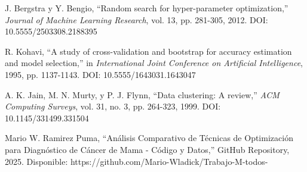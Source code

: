 \documentclass[conference]{IEEEtran}
\begin{document}
\begin{thebibliography}{00}
 J. Bergstra y Y. Bengio, ``Random search for hyper-parameter optimization,'' \textit{Journal of Machine Learning Research}, vol. 13, pp. 281-305, 2012. DOI: 10.5555/2503308.2188395

 R. Kohavi, ``A study of cross-validation and bootstrap for accuracy estimation and model selection,'' in \textit{International Joint Conference on Artificial Intelligence}, 1995, pp. 1137-1143. DOI: 10.5555/1643031.1643047

 A. K. Jain, M. N. Murty, y P. J. Flynn, ``Data clustering: A review,'' \textit{ACM Computing Surveys}, vol. 31, no. 3, pp. 264-323, 1999. DOI: 10.1145/331499.331504

 Mario W. Ramirez Puma, ``Análisis Comparativo de Técnicas de Optimización para Diagnóstico de Cáncer de Mama - Código y Datos,'' GitHub Repository, 2025. Disponible: https://github.com/Mario-Wladick/Trabajo-M-todos-

\end{thebibliography}
\end{document}
